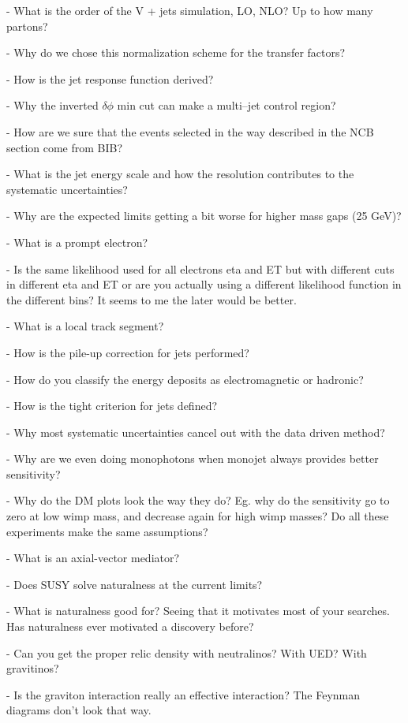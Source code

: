 \documentclass[a4paper,10pt,twoside,notitlepage]{article}
\begin{document}
\begin{description}
  - What is the order of the V + jets simulation, LO, NLO? Up to how many
  partons?

  - Why do we chose this normalization scheme for the transfer factors?

  - How is the jet response function derived?

  - Why the inverted $\delta \phi$ min cut can make a multi--jet control region?

  - How are we sure that the events selected in the way described in the NCB
  section come from BIB?

  - What is the jet energy scale and how the resolution contributes to the
  systematic uncertainties?

  - Why are the expected limits getting a bit worse for higher mass gaps (25
  GeV)?

  - What is a prompt electron?

  - Is the same likelihood used for all electrons eta and ET but with different
  cuts in different eta and ET or are you actually using a different likelihood
  function in the different bins? It seems to me the later would be better.

  - What is a local track segment?

  - How is the pile-up correction for jets performed?

  - How do you classify the energy deposits as electromagnetic or hadronic?

  - How is the tight criterion for jets defined?

  - Why most systematic uncertainties cancel out with the data driven method?

  - Why are we even doing monophotons when monojet always provides better
  sensitivity?

  - Why do the DM plots look the way they do? Eg. why do the sensitivity go to
  zero at low wimp mass, and decrease again for high wimp masses? Do all these
  experiments make the same assumptions?

  - What is an axial-vector mediator?

  - Does SUSY solve naturalness at the current limits?

  - What is naturalness good for? Seeing that it motivates most of your
  searches. Has naturalness ever motivated a discovery before?

  - Can you get the proper relic density with neutralinos? With UED? With
  gravitinos?

  - Is the graviton interaction really an effective interaction? The Feynman
  diagrams don’t look that way.


\end{description}
\end{document}
